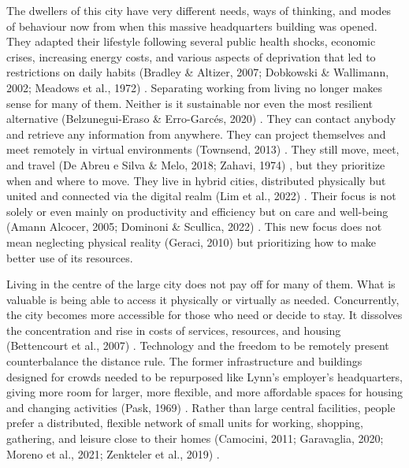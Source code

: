 The dwellers of this city have very different needs, ways of thinking, and modes of behaviour now from when this massive headquarters building was opened. They adapted their lifestyle following several public health shocks, economic crises, increasing energy costs, and various aspects of deprivation that led to restrictions on daily habits (Bradley \& Altizer, 2007; Dobkowski \& Wallimann, 2002; Meadows et al., 1972) \citep{Bradley2007, Dobkowski2002, Meadows1972}. Separating working from living no longer makes sense for many of them. Neither is it sustainable nor  even the most resilient alternative (Belzunegui-Eraso \& Erro-Garcés, 2020) \citep{Belzunegui-Eraso2020}. They can contact anybody and retrieve any information from anywhere. They can project themselves and meet remotely in virtual environments (Townsend, 2013) \citep{townsend2013smart}. They still move, meet, and travel (De Abreu e Silva \& Melo, 2018; Zahavi, 1974) \citep{DeAbreueSilva2018, Zahavi1974}, but they prioritize when and where to move. They live in hybrid cities, distributed physically but united and connected via the digital realm (Lim et al., 2022) \citep{Lim2022}. Their focus is not solely or even mainly on productivity and efficiency but on care and well-being (Amann Alcocer, 2005; Dominoni \& Scullica, 2022) \citep{AmannAlcocer2005, Dominoni2022}. This new focus does not mean neglecting physical reality (Geraci, 2010) \citep{Geraci2010} but prioritizing how to make better use of its resources. 

Living in the centre of the large city does not pay off for many of them. What is valuable is being able to access it physically or virtually as needed. Concurrently, the city becomes more accessible for those who need or decide to stay. It dissolves the concentration and rise in costs of services, resources, and housing (Bettencourt et al., 2007) \citep{Bettencourt2007}. Technology and the freedom to be remotely present counterbalance the distance rule. The former infrastructure and buildings designed for crowds needed to be repurposed like Lynn’s employer’s headquarters, giving more room for larger, more flexible, and more affordable spaces for housing and changing activities (Pask, 1969) \citep{Pask1969}. Rather than large central facilities, people prefer a distributed, flexible network of small units for working, shopping, gathering, and leisure close to their homes (Camocini, 2011; Garavaglia, 2020; Moreno et al., 2021; Zenkteler et al., 2019) \citep{Camocini2011TeleworkingWorkplace, Garavaglia2020, Moreno2021, Zenkteler2019Home-basedResponse}.

